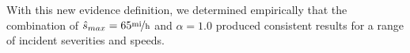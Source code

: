 \documentclass[12pt]{report}
\newcounter{time}
\newcounter{space}
\begin{document}
With this new evidence definition, we determined empirically that the
combination of $\hat{s}_{max}=65\unitfrac{mi}{h}$ and $\alpha=1.0$
produced consistent results for a range of incident severities and
speeds.








\end{document}
